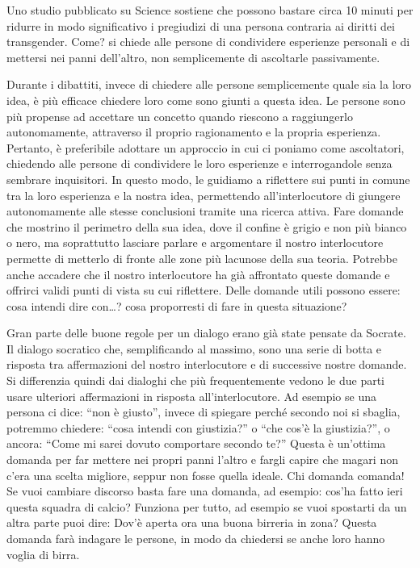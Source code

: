 \documentclass[12pt]{book} %
\begin{document}
Uno studio pubblicato su Science sostiene che
possono bastare circa 10 minuti per ridurre in modo significativo i pregiudizi di una persona contraria ai diritti dei transgender. Come? si chiede alle persone di condividere esperienze personali e di mettersi nei panni dell’altro, non semplicemente di ascoltarle passivamente.

Durante i dibattiti, invece di chiedere alle persone semplicemente quale sia la loro idea, è più efficace chiedere loro
come sono giunti a questa idea. Le persone sono più propense ad accettare un concetto quando riescono a raggiungerlo
autonomamente, attraverso il proprio ragionamento e la propria esperienza. Pertanto, è preferibile adottare un
approccio in cui ci poniamo come ascoltatori, chiedendo alle persone di condividere le loro esperienze e interrogandole
senza sembrare inquisitori. In questo modo, le guidiamo a riflettere sui punti in comune tra la loro esperienza e la
nostra idea, permettendo all'interlocutore di giungere autonomamente alle stesse conclusioni tramite una ricerca
attiva. Fare domande che mostrino il perimetro della sua idea, dove il confine è grigio e non più bianco o nero, ma
soprattutto lasciare parlare e argomentare il nostro interlocutore permette di metterlo di fronte alle zone più
lacunose della sua teoria. Potrebbe anche accadere che il
nostro interlocutore ha già affrontato queste domande e offrirci validi punti di vista su cui riflettere. Delle domande
utili possono essere: cosa intendi dire con…? cosa proporresti di fare in questa situazione?

Gran parte delle buone regole per un dialogo erano già state pensate da Socrate. Il dialogo socratico che, 
semplificando al massimo, sono una serie di botta e risposta tra affermazioni del nostro interlocutore e
di successive nostre domande. Si differenzia quindi dai dialoghi che più frequentemente vedono le due parti usare
ulteriori affermazioni in risposta all'interlocutore. Ad esempio se una persona ci dice: “non è
giusto”, invece di spiegare perché secondo noi si sbaglia, potremmo chiedere: “cosa intendi con giustizia?” o “che
cos'è la giustizia?”, o ancora: “Come mi sarei dovuto comportare secondo te?” Questa è
un'ottima domanda per far mettere nei propri panni l'altro e fargli capire
che magari non c'era una scelta migliore, seppur non fosse quella ideale.
Chi domanda comanda! Se vuoi cambiare discorso basta fare una domanda, ad esempio: cos'ha fatto ieri questa squadra di calcio?
Funziona per tutto, ad esempio se vuoi spostarti da un altra parte puoi dire: Dov'è aperta ora una buona birreria in zona? Questa domanda farà indagare le persone, in modo da chiedersi se anche loro hanno voglia di birra.
\end{document}
